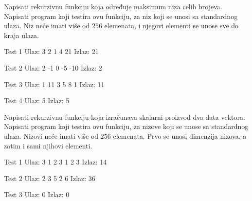 
\begin{Exercise}[label=109]
Napisati rekurzivnu funkciju koja određuje maksimum niza
  celih brojeva. Napisati program koji testira ovu funkciju, za niz
  koji se unosi sa standardnog ulaza. Niz neće imati više od $256$ elemenata, i
  njegovi elementi se unose sve do kraja ulaza.
  
\begin{miditest}
\begin{test}{Test 1}
Ulaz:   3 2 1 4 21    
Izlaz:  21              
\end{test}
\end{miditest}
\begin{miditest}
\begin{test}{Test 2}
Ulaz:   2 -1 0 -5 -10
Izlaz:  2                
\end{test}
\end{miditest}

\begin{miditest}
\begin{test}{Test 3}
Ulaz:  1 11 3 5 8 1    
Izlaz:  11
\end{test}
\end{miditest}
\begin{minitest}
\begin{test}{Test 4}
Ulaz:   5
Izlaz:  5
\end{test}
\end{minitest}
\end{Exercise}
\begin{Answer}[ref=109]
\end{Answer}

\begin{Exercise}[label=110]
Napisati rekurzivnu funkciju koja izračunava skalarni
  proizvod dva data vektora.  Napisati program koji testira ovu
  funkciju, za nizove koji se unose sa standardnog ulaza. Nizovi neće imati više od $256$ elemenata. Prvo se unosi dimenzija nizova, a
  zatim i sami njihovi elementi.
  
\begin{miditest}
\begin{test}{Test 1}
Ulaz:    3 1 2 3 1 2 3 
Izlaz:   14                 
\end{test}
\end{miditest}
\begin{minitest}
\begin{test}{Test 2}
Ulaz:   2 3 5 2 6       
Izlaz:   36              
\end{test}
\end{minitest}


\begin{minitest}
\begin{test}{Test 3}
Ulaz:   0
Izlaz:   0
\end{test}
\end{minitest}
\end{Exercise}
\begin{Answer}[ref=110]
\end{Answer}


